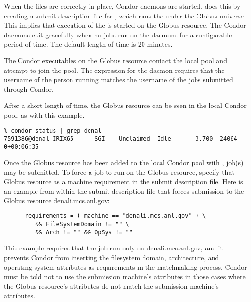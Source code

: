 When the files are correctly in place,
Condor daemons are started.
 does this by creating a submit description file for
, which runs the  under the Globus
universe.
This implies that execution of the  is started on the Globus
resource.
The Condor daemons exit gracefully when no jobs run on the daemons for a
configurable period of time. The default length of time is 20 minutes.

The Condor executables on the Globus resource contact the local pool and
attempt to join the pool.  The 
expression for the  daemon requires that the username
of the person running  matches the username of the jobs
submitted through Condor.

After a short length of time,
the Globus resource can be seen in the local Condor pool,
as with this example.

\begin{verbatim}
% condor_status | grep denal
7591386@denal IRIX65      SGI    Unclaimed  Idle       3.700  24064  0+00:06:35
\end{verbatim}

Once the Globus resource has been added to the local Condor
pool with ,
job(s) may be submitted.
To force a job to run on the Globus resource,
specify that Globus resource as a machine requirement
in the submit description file. 
Here is an example from within the submit description file
that forces submission to the Globus resource denali.mcs.anl.gov:
\begin{verbatim}
      requirements = ( machine == "denali.mcs.anl.gov" ) \
         && FileSystemDomain != "" \
         && Arch != "" && OpSys != ""
\end{verbatim}
This example requires that the job run only on denali.mcs.anl.gov,
and it prevents Condor from inserting the filesystem domain,
architecture, and operating system attributes as requirements
in the matchmaking process.
Condor must be told not to use the submission machine's
attributes in those cases
where the Globus resource's attributes
do not match the submission machine's attributes.
